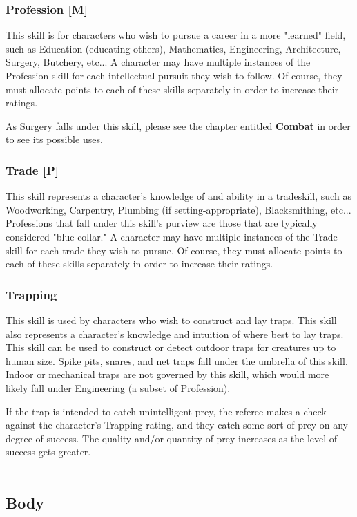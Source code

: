 \documentclass[oneside]{book}
\begin{document}
\begin{multicols}{2}
\subsubsection{Profession [M]}
This skill is for characters who wish to pursue a career in a more "learned" field, such as Education (educating others), Mathematics, Engineering, Architecture, Surgery, Butchery, etc... A character may have multiple instances of the Profession skill for each intellectual pursuit they wish to follow. Of course, they must allocate points to each of these skills separately in order to increase their ratings. 

As Surgery falls under this skill, please see the chapter entitled \textbf{Combat} in order to see its possible uses. 


\subsubsection{Trade [P]}
This skill represents a character's knowledge of and ability in a tradeskill, such as Woodworking, Carpentry, Plumbing (if setting-appropriate), Blacksmithing, etc... Professions that fall under this skill's purview are those that are typically considered "blue-collar."  A character may have multiple instances of the Trade skill for each trade they wish to pursue. Of course, they must allocate points to each of these skills separately in order to increase their ratings. 

\subsubsection{Trapping}
This skill is used by characters who wish to construct and lay traps. This skill also represents a character's knowledge and intuition of where best to lay traps. This skill can be used to construct or detect outdoor traps for creatures up to human size. Spike pits, snares, and net traps fall under the umbrella of this skill. Indoor or mechanical traps are not governed by this skill, which would more likely fall under Engineering (a subset of Profession).

If the trap is intended to catch unintelligent prey, the referee makes a check against the character's Trapping rating, and they catch some sort of prey on any degree of success. The quality and/or quantity of prey increases as the level of success gets greater. 
\\
\\
\subsection{Body}

\end{multicols}
\end{document}
